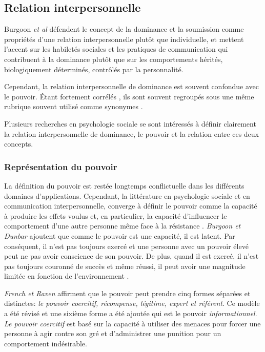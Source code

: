 	\subsection{Relation interpersonnelle}
		Burgoon \emph{et al} \cite{burgoon1998nature} défendent le concept de la dominance et la soumission comme propriétés d'une relation interpersonnelle plutôt que individuelle, et mettent l'accent sur les habiletés sociales et les pratiques de communication qui contribuent à la dominance plutôt que sur les comportements hérités, biologiquement déterminés, contrôlés par la personnalité.
		
		Cependant, la relation interpersonnelle de dominance est souvent confondue avec le pouvoir. Étant fortement corrélés \cite{dunbar2005perceptions}, ils sont souvent regroupés sous une même rubrique souvent utilisé comme synonymes  \cite{ellyson1985power,burgoon1998nature}.
		
		Plusieurs recherches en psychologie sociale \cite{burgoon1998nature,dunbar2005perceptions,burgoon2006nonverbal} se sont intéressés à définir clairement la relation interpersonnelle de dominance, le pouvoir et la relation entre ces deux concepts. 
		
		\subsubsection{Représentation du pouvoir}
		
		La définition du pouvoir est restée longtemps conflictuelle dans les différents domaines d'applications. Cependant, la littérature en psychologie sociale et en communication interpersonnelle, converge à définir le pouvoir comme la capacité à produire les effets voulus et, en particulier, la capacité d'influencer le comportement d'une autre personne même face à la résistance  \cite{burgoon2000interactionist,burgoon2006nonverbal,huston1983power}.
		\emph{Burgoon et Dunbar} \cite{burgoon1998nature,dunbar2005perceptions} ajoutent que comme le pouvoir est une capacité, il est latent. Par conséquent, il n'est pas toujours exercé et une personne avec un pouvoir élevé peut ne pas avoir conscience de son pouvoir. De plus, quand il est exercé, il n'est pas toujours couronné de succès et même réussi, il peut avoir une magnitude limitée en fonction de l'environnement \cite{huston1983power}.
		
		\emph{French et Raven}\cite{french1959bases} affirment que le pouvoir peut prendre cinq formes séparées et distinctes: \textit{le pouvoir coercitif, récompense, légitime, expert et référent}. Ce modèle a été révisé et une sixième forme a été ajoutée qui est le pouvoir \textit{informationnel}.
		\textit{Le pouvoir coercitif} est basé sur la capacité à utiliser des menaces pour forcer une personne à agir contre son gré et d'administrer une punition pour un comportement indésirable.
		
